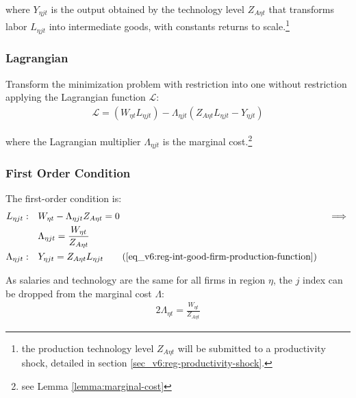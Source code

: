\documentclass[../thesis.tex]{subfiles}
\begin{document}
where $Y_{\eta jt}$ is the output obtained by the technology level $Z_{A\eta t}$ that transforms labor $L_{\eta jt}$ into intermediate goods, with constants returns to scale.\footnote{the production technology level $Z_{A\eta t}$ will be submitted to a productivity shock, detailed in section \ref{sec_v6:reg-productivity-shock}.}

\subsubsection*{Lagrangian}

Transform the minimization problem with restriction into one without restriction applying the Lagrangian function $\mathcal{L}$:
\begin{align}
	\label{eq_v6:reg-int-good-firm-lagrangian}
	\mathcal{L} = (W_{\eta t} L_{\eta jt}) - \Lambda_{\eta jt} (Z_{A\eta t} L_{\eta jt} - Y_{\eta jt})
\end{align}

where the Lagrangian multiplier $\Lambda_{\eta jt}$ is the marginal cost.\footnote{see Lemma \ref{lemma:marginal-cost}}

\subsubsection*{First Order Condition}

The first-order condition is:
\begin{alignat}{2}
	L_{\eta jt}: \quad & W_{\eta t} - \Lambda_{\eta jt} Z_{A\eta t} = 0 \quad &&\implies \nonumber \\ 
	& \Lambda_{\eta jt} = \frac{W_{\eta t}}{Z_{A\eta t}} \label{eq_v6:reg-int-good-firm-FOC-Lt-0} \\
	\Lambda_{\eta jt}: \quad & Y_{\eta jt} = Z_{A\eta t} L_{\eta jt} \tag{\ref{eq_v6:reg-int-good-firm-production-function}}
\end{alignat}

As salaries and technology are the same for all firms in region $\eta$, the $j$ index can be dropped from the marginal cost $\Lambda$:
\begin{alignat}{2}
	\Lambda_{\eta t} = \frac{W_{\eta t}}{Z_{A\eta t}} \label{eq_v6:reg-int-good-firm-FOC-Lt}
\end{alignat}
\end{document}
